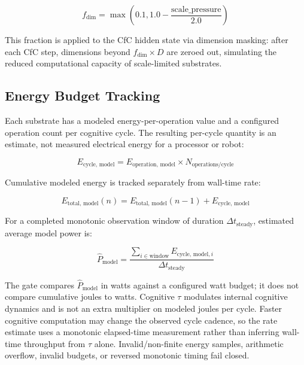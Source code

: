 \documentclass[12pt,a4paper]{article}
\begin{document}
\begin{equation}
f_{\text{dim}} = \max\left(0.1, 1.0 - \frac{\text{scale\_pressure}}{2.0}\right)
\end{equation}

This fraction is applied to the CfC hidden state via dimension masking: after each CfC step, dimensions beyond $f_{\text{dim}} \times D$ are zeroed out, simulating the reduced computational capacity of scale-limited substrates.

\subsection{Energy Budget Tracking}

Each substrate has a modeled energy-per-operation value and a configured operation count per cognitive cycle. The resulting per-cycle quantity is an estimate, not measured electrical energy for a processor or robot:

\begin{equation}
E_{\text{cycle, model}} = E_{\text{operation, model}} \times N_{\text{operations/cycle}}
\end{equation}

Cumulative modeled energy is tracked separately from wall-time rate:

\begin{equation}
E_{\text{total, model}}(n) = E_{\text{total, model}}(n-1) + E_{\text{cycle, model}}
\end{equation}

For a completed monotonic observation window of duration $\Delta t_{\text{steady}}$, estimated average model power is:

\begin{equation}
\widehat{P}_{\text{model}} =
\frac{\sum_{i \in \text{window}} E_{\text{cycle, model},i}}
{\Delta t_{\text{steady}}}
\end{equation}

The gate compares $\widehat{P}_{\text{model}}$ in watts against a configured watt budget; it does not compare cumulative joules to watts. Cognitive $\tau$ modulates internal cognitive dynamics and is not an extra multiplier on modeled joules per cycle. Faster cognitive computation may change the observed cycle cadence, so the rate estimate uses a monotonic elapsed-time measurement rather than inferring wall-time throughput from $\tau$ alone. Invalid/non-finite energy samples, arithmetic overflow, invalid budgets, or reversed monotonic timing fail closed.
\end{document}
